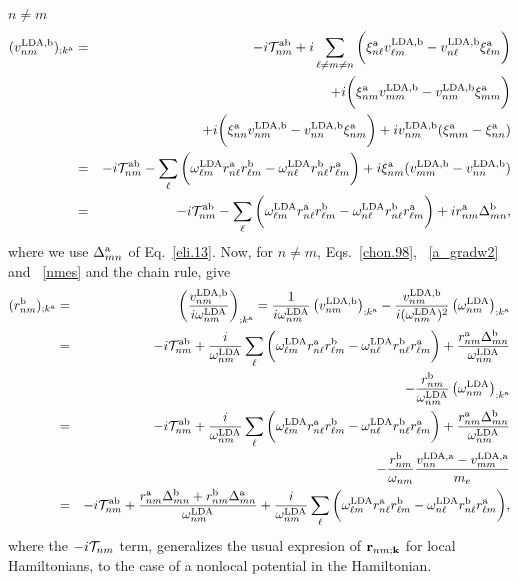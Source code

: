  $n\ne m$
\begin{eqnarray}\label{nmes}
(v^{\mathrm{LDA},\mathrm{b}}_{nm})_{;k^{\mathrm{a}}}&=&
-i{\cal T}^{\mathrm{a}\mathrm{b}}_{nm}
+i
\sum_{\ell\ne m\ne n}
\bigg(
\xi^{\mathrm{a}}_{n\ell}
v^{\mathrm{LDA},\mathrm{b}}_{\ell m}
-
v^{\mathrm{LDA},\mathrm{b}}_{n\ell}
\xi^{\mathrm{a}}_{\ell m}
\bigg)
\nonumber\\
&&+
i
\bigg(
\xi^{\mathrm{a}}_{nm}
v^{\mathrm{LDA},\mathrm{b}}_{mm}
-
v^{\mathrm{LDA},\mathrm{b}}_{nm}
\xi^{\mathrm{a}}_{mm}
\bigg)
\nonumber\\
&&+
i
\bigg(
\xi^{\mathrm{a}}_{nn}
v^{\mathrm{LDA},\mathrm{b}}_{nm}
-
v^{\mathrm{LDA},\mathrm{b}}_{nn}
\xi^{\mathrm{a}}_{nm}
\bigg)
+i
v^{\mathrm{LDA},\mathrm{b}}_{nm}(\xi^{\mathrm{a}}_{mm}
-
\xi^{\mathrm{a}}_{nn}
)
\nonumber \\
&=&
-i{\cal T}^{\mathrm{a}\mathrm{b}}_{nm}
-
\sum_{\ell}
\bigg(
\omega^{\mathrm{LDA}}_{\ell m}
r^{\mathrm{a}}_{n\ell}
r^{\mathrm{b}}_{\ell m}
-
\omega^{\mathrm{LDA}}_{n\ell}
r^{\mathrm{b}}_{n\ell}
r^{\mathrm{a}}_{\ell m}
\bigg)
+i
\xi^{\mathrm{a}}_{nm}
(v^{\mathrm{LDA},\mathrm{b}}_{mm}
-
v^{\mathrm{LDA},\mathrm{b}}_{nn}
)
\nonumber \\
&=&
-i{\cal T}^{\mathrm{a}\mathrm{b}}_{nm}
-
\sum_{\ell}
\bigg(
\omega^{\mathrm{LDA}}_{\ell m} 
r^{\mathrm{a}}_{n\ell} 
r^{\mathrm{b}}_{\ell m}
-
\omega^{\mathrm{LDA}}_{n\ell} 
r^{\mathrm{b}}_{n\ell} 
r^{\mathrm{a}}_{\ell m}
\bigg)
+i 
r^{\mathrm{a}}_{nm}
\Delta^{\mathrm{b}}_{mn}
,
\end{eqnarray} 
where we use $\Delta^{\mathrm{a}}_{mn}$ of Eq.~\eqref{eli.13}.
Now, for $n \ne m$, Eqs.~\eqref{chon.98},
~\eqref{a_gradw2} and 
~\eqref{nmes} and the chain rule, give
\begin{eqnarray}\label{na_rgendevn}
(r^{\mathrm{b}}_{nm})_{;k^{\mathrm{a}}}
&=&\left(\frac{v^{\mathrm{LDA},\mathrm{b}}_{nm}}{i\omega^{\mathrm{LDA}}_{nm}}\right)_{;k^{\mathrm{a}}}
=
\frac{1}
{i\omega^{\mathrm{LDA}}_{nm}}
\left(
v^{\mathrm{LDA},\mathrm{b}}_{nm}
\right)_{;k^{\mathrm{a}}}
-
\frac{v^{\mathrm{LDA},\mathrm{b}}_{nm}}
{i(\omega^{\mathrm{LDA}}_{nm})^2}
\left(
\omega^{\mathrm{LDA}}_{nm}
\right)_{;k^{\mathrm{a}}}
\nonumber \\
&=&
-i{\cal T}^{\mathrm{a}\mathrm{b}}_{nm}
+
\frac{i}{\omega^{\mathrm{LDA}}_{nm}}
\sum_{\ell}
\bigg(
\omega^{\mathrm{LDA}}_{\ell m}
r^{\mathrm{a}}_{n\ell}
r^{\mathrm{b}}_{\ell m}
-
\omega^{\mathrm{LDA}}_{n\ell}
r^{\mathrm{b}}_{n\ell}
r^{\mathrm{a}}_{\ell m}
\bigg)
+
\frac{r^{\mathrm{a}}_{nm}
\Delta^{\mathrm{b}}_{mn}}
{\omega^{\mathrm{LDA}}_{nm}}
\nonumber \\
&&
-
\frac{r^{\mathrm{b}}_{nm}}
{\omega^{\mathrm{LDA}}_{nm}}
\left(
\omega^{\mathrm{LDA}}_{nm}
\right)_{;k^{\mathrm{a}}}
\nonumber \\
&=&
-i{\cal T}^{\mathrm{a}\mathrm{b}}_{nm}
+
\frac{i}{\omega^{\mathrm{LDA}}_{nm}}
\sum_{\ell}
\bigg(
\omega^{\mathrm{LDA}}_{\ell m}
r^{\mathrm{a}}_{n\ell}
r^{\mathrm{b}}_{\ell m}
-
\omega^{\mathrm{LDA}}_{n\ell}
r^{\mathrm{b}}_{n\ell}
r^{\mathrm{a}}_{\ell m}
\bigg)
+
\frac{r^{\mathrm{a}}_{nm}
\Delta^{\mathrm{b}}_{mn}}
{\omega^{\mathrm{LDA}}_{nm}}
\nonumber \\
&&
-
\frac{r^{\mathrm{b}}_{nm}}
{\omega_{nm}}
\frac{v^{\mathrm{LDA},\mathrm{a}}_{nn}-v^{\mathrm{LDA},\mathrm{a}}_{mm}}{m_e}
\nonumber \\
&=&
-i{\cal T}^{\mathrm{a}\mathrm{b}}_{nm}
+
\frac{
r^{\mathrm{a}}_{nm}
\Delta^{\mathrm{b}}_{mn}
+r^{\mathrm{b}}_{nm}
\Delta^{\mathrm{a}}_{mn}
}
{\omega^{\mathrm{LDA}}_{nm}}
+
\frac{i}{\omega^{\mathrm{LDA}}_{nm}}
\sum_{\ell}
\bigg(
\omega^{\mathrm{LDA}}_{\ell m}
r^{\mathrm{a}}_{n\ell}
r^{\mathrm{b}}_{\ell m}
-
\omega^{\mathrm{LDA}}_{n\ell}
r^{\mathrm{b}}_{n\ell}
r^{\mathrm{a}}_{\ell m}
\bigg)
,
\end{eqnarray}
where the $-i{\cal T}_{nm}$ term, generalizes the usual expresion of
$\mathbf{r}_{nm;\mathbf{k}}$ for local 
Hamiltonians,\cite{aversaPRB95,nastosPRB05,cabellosPRB09,rashkeevPRB98}
to
the case of a
nonlocal potential in the Hamiltonian.
